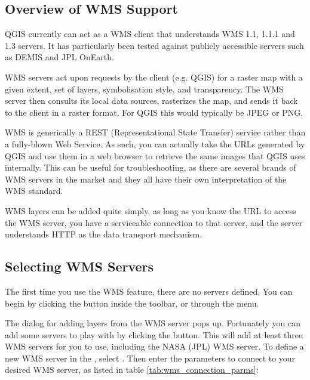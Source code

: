 \subsection{Overview of WMS Support}\label{sec:ogc-wms-about}

QGIS currently can act as a WMS client that understands WMS 1.1, 1.1.1 and 1.3
servers.  It has particularly been tested against publicly accessible servers
such as DEMIS and JPL OnEarth.

WMS servers act upon requests by the client (e.g. QGIS) for a raster map with
a given extent, set of layers, symbolisation style, and transparency.  The WMS
server then consults its local data sources, rasterizes the map, and sends
it back to the client in a raster format.  For QGIS this would typically
be JPEG or PNG.

WMS is generically a REST (Representational State Transfer) service rather than
a fully-blown Web Service.  As such, you can actually take the URLs generated by
QGIS and use them in a web browser to retrieve the same images that QGIS uses
internally.  This can be useful for troubleshooting, as there are
several brands of WMS servers in the market and they all have their own
interpretation of the WMS standard.

WMS layers can be added quite simply, as long as you know the URL to access
the WMS server, you have a serviceable connection to that server, and the
server understands HTTP as the data transport mechanism.

\subsection{Selecting WMS Servers}\label{sec:ogc-wms-servers}

The first time you use the WMS feature, there are no servers defined. You
can begin by clicking the  
button inside the toolbar, or through the  
\arrow {} menu.

The dialog  for adding layers from the 
WMS server pops up. Fortunately you can
add some servers to play with by clicking the 
button. This will add at least three WMS servers for you to use, including the NASA (JPL)
WMS server. To define a new WMS server in the ,
select . Then enter the parameters to connect to your desired
WMS server, as listed in table \ref{tab:wms_connection_parms}:

